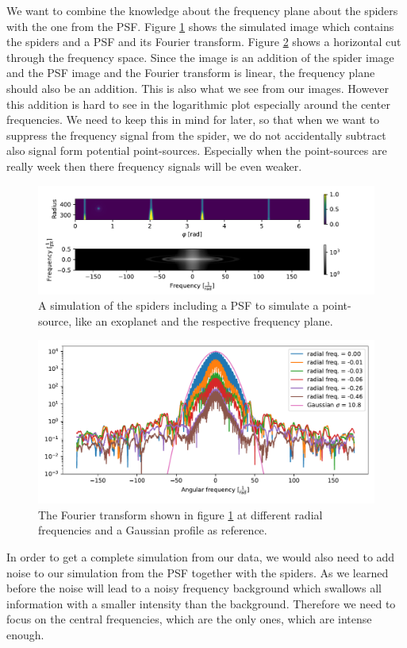 We want to combine the knowledge about the frequency plane about the spiders with the one from the PSF. Figure \ref{fig:simulated_spyder_PSF} shows the simulated image which contains the spiders and a PSF and its Fourier transform. Figure \ref{fig:simspi_PSF_angularfreq} shows a horizontal cut through the frequency space. Since the image is an addition of the spider image and the PSF image and the Fourier transform is linear, the frequency plane should also be an addition. This is also what we see from our images. However this addition is hard to see in the logarithmic plot especially around the center frequencies. We need to keep this in mind for later, so that when we want to suppress the frequency signal from the spider, we do not accidentally subtract also signal form potential point-sources. Especially when the point-sources are really week then there frequency signals will be even weaker. 
\begin{figure}[H]
	\centering
		\includegraphics[width=1.1\textwidth]{pics/simulated_spyder_PSF.pdf}
		\caption{A simulation of the spiders including a PSF to simulate a point-source, like an exoplanet and the respective frequency plane.}
		\label{fig:simulated_spyder_PSF}
\end{figure}
\begin{figure}[H]
	\centering
		\includegraphics[width=1.0\textwidth]{pics/simspi_PSF_angularfreq.pdf}
		\caption{The Fourier transform shown in figure \ref{fig:simulated_spyder_PSF} at different radial frequencies and a Gaussian profile as reference.}
		\label{fig:simspi_PSF_angularfreq}
\end{figure}
In order to get a complete simulation from our data, we would also need to add noise to our simulation from the PSF together with the spiders. As we learned before the noise will lead to a noisy frequency background which swallows all information with a smaller intensity than the background. Therefore we need to focus on the central frequencies, which are the only ones, which are intense enough. 